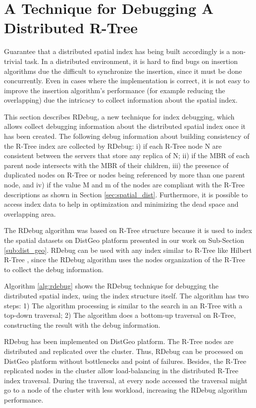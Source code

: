 \section{A Technique for Debugging A Distributed R-Tree}
\label{sec:rdebug}

Guarantee that a distributed spatial index has being built accordingly is a non-trivial task. 
In a distributed environment, it is hard to find bugs on insertion algorithms due the difficult to synchronize the insertion, since it must be done concurrently.
Even in cases where the implementation is correct, it is not easy to improve the insertion algorithm's performance (for example reducing the overlapping) 
due the intricacy to collect information about the spatial index.

This section describes RDebug, a new technique for index debugging, which allows collect debugging information about the distributed spatial index once it has been created. 
The following debug information about building consistency of the R-Tree index are collected by RDebug: 
i) if each R-Tree node N are consistent between the servers that store any replica of N;
ii) if the MBR of each parent node intersects with the MBR of their children, 
iii) the presence of duplicated nodes on R-Tree or nodes being referenced by more than one parent node, and 
iv) if the value M and m of the nodes are compliant with the R-Tree descriptions as shown in Section \ref{sec:spatial_dist}. 
Furthermore, it is possible to access index data to help in optimization and minimizing  the dead space and overlapping area.

The RDebug algorithm was based on R-Tree structure because it is used to index the spatial datasets on DistGeo platform presented in our work on Sub-Section \ref{sub:dist_geo}.
RDebug can be used with any index similar to R-Tree like Hilbert R-Tree \cite{kamel1994hilbert}, 
since the RDebug algorithm uses the nodes organization of the R-Tree to collect the debug information.

Algorithm \ref{alg:rdebug} shows the RDebug technique for debugging the distributed spatial index, using the index structure itself. The algorithm has two steps:
1) The algorithm processing is similar to the search in an R-Tree with a top-down traversal; 
2) The algorithm does a bottom-up traversal on R-Tree, constructing the result with the debug information.

RDebug has been implemented on DistGeo platform. The R-Tree nodes are distributed and replicated over the cluster. 
Thus, RDebug can be processed on DistGeo platform without bottlenecks and point of failures. 
Besides, the R-Tree replicated nodes in the cluster allow load-balancing in the distributed R-Tree index traversal. 
During the traversal, at every node accessed the traversal might go to a node of the cluster with less workload, increasing the RDebug algorithm performance. 

